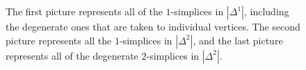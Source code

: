 \documentclass[12pt]{article}
\theoremstyle{plain}
\theoremstyle{definition}
\begin{document}
\begin{figure}[!htp]
\begin{center}
\end{center}
\caption{The first picture represents all of the $1$-simplices in $|\Delta^1|$, including the degenerate ones that are taken to individual vertices. The second picture represents all the $1$-simplices in $|\Delta^2|$, and the last picture represents all of the degenerate $2$-simplices in $|\Delta^2|$.}\label{F: fig10}
\end{figure}
\end{document}
